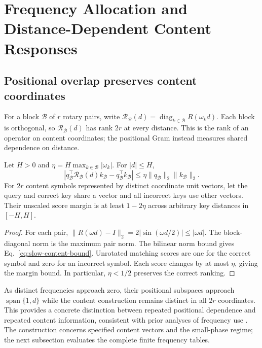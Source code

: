 \section{Frequency Allocation and Distance-Dependent Content Responses}
\label{sec:allocation-response}

\subsection{Positional overlap preserves content coordinates}
\label{sec:content-coordinate-retention}
For a block $\mathcal B$ of $r$ rotary pairs, write
$\mathcal R_{\mathcal B}(d)=\operatorname{diag}_{k\in\mathcal B}R(\omega_kd)$.
Each block is orthogonal, so $\mathcal R_{\mathcal B}(d)$ has rank $2r$ at
every distance. This is the rank of an operator on content coordinates;
the positional Gram instead measures shared dependence on distance.

\begin{proposition}
\label{prop:slow-content-matching}
Let $H>0$ and $\eta=H\max_{k\in\mathcal B}|\omega_k|$. For $|d|\le H$,
\begin{equation}
\left|q_{\mathcal B}^{\top}\mathcal R_{\mathcal B}(d)k_{\mathcal B}
-q_{\mathcal B}^{\top}k_{\mathcal B}\right|
\le\eta\|q_{\mathcal B}\|_2\|k_{\mathcal B}\|_2.
\label{eq:slow-content-bound}
\end{equation}
For $2r$ content symbols represented by distinct coordinate unit vectors,
let the query and correct key share a vector and all incorrect keys use
other vectors. Their unscaled score margin is at least $1-2\eta$ across
arbitrary key distances in $[-H,H]$.
\end{proposition}

\begin{proof}
For each pair,
$\|R(\omega d)-I\|_2=2|\sin(\omega d/2)|\le|\omega d|$.
The block-diagonal norm is the maximum pair norm. The bilinear norm bound
gives Eq.~\eqref{eq:slow-content-bound}. Unrotated matching scores are one
for the correct symbol and zero for an incorrect symbol. Each score
changes by at most $\eta$, giving the margin bound. In particular,
$\eta<1/2$ preserves the correct ranking.
\end{proof}

As distinct frequencies approach zero, their positional subspaces approach
$\operatorname{span}\{1,d\}$ while the content construction remains
distinct in all $2r$ coordinates. This provides a concrete distinction
between repeated positional dependence and repeated content information,
consistent with prior analyses of frequency use \citep{barbero2025round}.
The construction concerns specified content vectors and the small-phase
regime; the next subsection evaluates the complete finite frequency tables.

